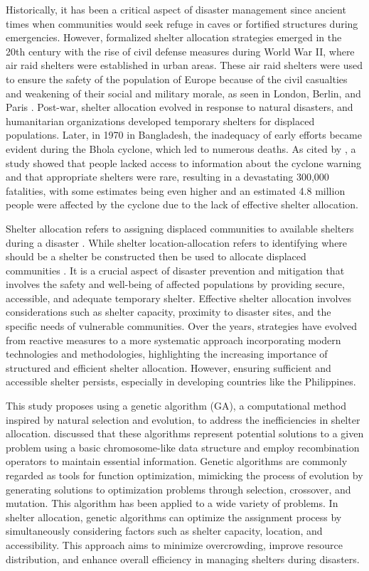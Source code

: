 	Historically, it has been a critical aspect of disaster management since ancient times when communities would seek refuge in caves or fortified structures during emergencies. However, formalized shelter allocation strategies emerged in the 20th century with the rise of civil defense measures during World War II, where air raid shelters were established in urban areas. These air raid shelters were used to ensure the safety of the population of Europe because of the civil casualties and weakening of their social and military morale, as seen in London, Berlin, and Paris \parencite{Flebus1941,Shakibamaesh2015}. Post-war, shelter allocation evolved in response to natural disasters, and humanitarian organizations developed temporary shelters for displaced populations. Later, in 1970 in Bangladesh, the inadequacy of early efforts became evident during the Bhola cyclone, which led to numerous deaths. As cited by \textcite{Hossain2018}, a study showed that people lacked access to information about the cyclone warning and that appropriate shelters were rare, resulting in a devastating 300,000 fatalities, with some estimates being even higher and an estimated 4.8 million people were affected by the cyclone due to the lack of effective shelter allocation.
	
	Shelter allocation refers to assigning displaced communities to available shelters during a disaster \parencite{Yin2023}. While shelter location-allocation refers to identifying where should be a shelter be constructed then be used to allocate displaced communities \parencite{Xiujuan2019}. It is a crucial aspect of disaster prevention and mitigation that involves the safety and well-being of affected populations by providing secure, accessible, and adequate temporary shelter. Effective shelter allocation involves considerations such as shelter capacity, proximity to disaster sites, and the specific needs of vulnerable communities. Over the years, strategies have evolved from reactive measures to a more systematic approach incorporating modern technologies and methodologies, highlighting the increasing importance of structured and efficient shelter allocation. However, ensuring sufficient and accessible shelter persists, especially in developing countries like the Philippines.
	
	This study proposes using a genetic algorithm (GA), a computational method inspired by natural selection and evolution, to address the inefficiencies in shelter allocation. \textcite{Mathew2012} discussed that these algorithms represent potential solutions to a given problem using a basic chromosome-like data structure and employ recombination operators to maintain essential information. Genetic algorithms are commonly regarded as tools for function optimization, mimicking the process of evolution by generating solutions to optimization problems through selection, crossover, and mutation. This algorithm has been applied to a wide variety of problems. In shelter allocation, genetic algorithms can optimize the assignment process by simultaneously considering factors such as shelter capacity, location, and accessibility. This approach aims to minimize overcrowding, improve resource distribution, and enhance overall efficiency in managing shelters during disasters.
	
